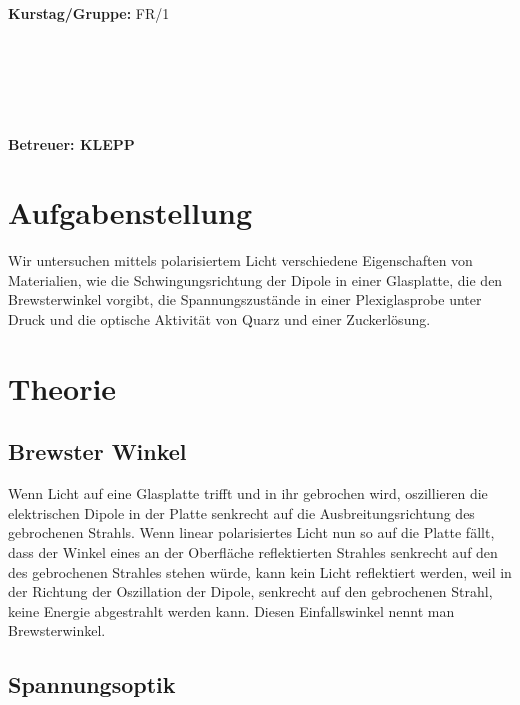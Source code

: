 \documentclass[twoside]{article}
\begin{document}
\begin{verbatim}


\end{verbatim}
			\begin{flushleft}
			\textbf{\Large{Kurstag/Gruppe:}} \Large{FR/1}
			\end{flushleft}

\begin{verbatim}






\end{verbatim}
			\begin{flushleft}
			\LARGE{\textbf{Betreuer:\Large{ KLEPP }}}		
			\end{flushleft}
			
\section{Aufgabenstellung}
Wir untersuchen mittels polarisiertem Licht verschiedene Eigenschaften von Materialien, wie die Schwingungsrichtung der Dipole in einer Glasplatte, die den Brewsterwinkel vorgibt, die Spannungszustände in einer Plexiglasprobe unter Druck und die optische Aktivität von Quarz und einer Zuckerlösung.

\section{Theorie}
\subsection{Brewster Winkel}
Wenn Licht auf eine Glasplatte trifft und in ihr gebrochen wird, oszillieren die elektrischen Dipole in der Platte senkrecht auf die Ausbreitungsrichtung des gebrochenen Strahls. Wenn linear polarisiertes Licht nun so auf die Platte fällt, dass der Winkel eines an der Oberfläche reflektierten Strahles senkrecht auf den des gebrochenen Strahles stehen würde, kann kein Licht reflektiert werden, weil in der Richtung der Oszillation der Dipole, senkrecht auf den gebrochenen Strahl, keine Energie abgestrahlt werden kann. Diesen Einfallswinkel nennt man Brewsterwinkel.
\subsection{Spannungsoptik}
\end{document}
